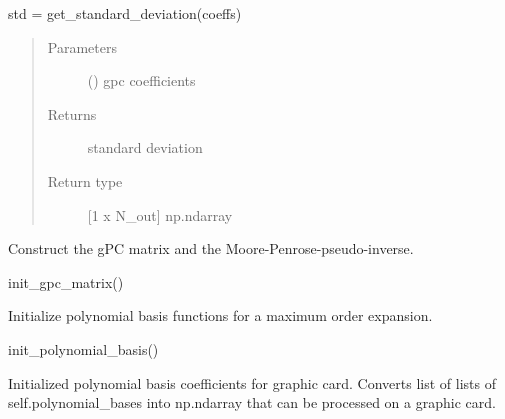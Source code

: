 \documentclass[letterpaper,10pt,english,openany,oneside]{sphinxmanual}
\begin{document}
\begin{fulllineitems}
\begin{fulllineitems}
std = get\_standard\_deviation(coeffs)
\begin{quote}\begin{description}
\item[{Parameters}] \leavevmode
{} (\sphinxstyleliteralemphasis{\sphinxupquote{ {[}}}\sphinxstyleliteralemphasis{\sphinxupquote{{]}}}) \textendash{} gpc coefficients

\item[{Returns}] \leavevmode
{} \textendash{} standard deviation

\item[{Return type}] \leavevmode
{[}1 x N\_out{]} np.ndarray

\end{description}\end{quote}

\end{fulllineitems}


\begin{fulllineitems}
\label{\detokenize{pygpc:pygpc.gpc.gPC.set_gpc_matrix}}
Construct the gPC matrix and  the Moore-Penrose-pseudo-inverse.

init\_gpc\_matrix()

\end{fulllineitems}


\begin{fulllineitems}
\label{\detokenize{pygpc:pygpc.gpc.gPC.init_polynomial_basis}}
Initialize polynomial basis functions for a maximum order expansion.

init\_polynomial\_basis()

\end{fulllineitems}


\begin{fulllineitems}
\label{\detokenize{pygpc:pygpc.gpc.gPC.init_polynomial_basis_gpu}}
Initialized polynomial basis coefficients for graphic card. Converts list of lists of self.polynomial\_bases
into np.ndarray that can be processed on a graphic card.


\end{fulllineitems}
\end{fulllineitems}
\end{document}
